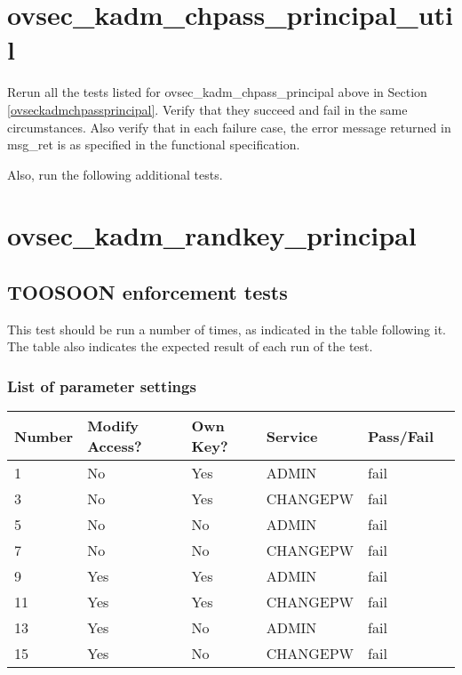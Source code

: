 \section{ovsec_kadm_chpass_principal_util}

Rerun all the tests listed for ovsec_kadm_chpass_principal above in
Section \ref{ovseckadmchpassprincipal}.  Verify that they succeed
and fail in the same circumstances.  Also verify that in each failure
case, the error message returned in msg_ret is as specified in the
functional specification.

Also, run the following additional tests.







\section{ovsec_kadm_randkey_principal}

\subsection{TOOSOON enforcement tests}

This test should be run a number of times, as indicated in the table
following it.  The table also indicates the expected result of each
run of the test.


\subsubsection{List of parameter settings}

\begin{tabular}{llllll}
Number & Modify Access? & Own Key? & Service & Pass/Fail \\ \hline
1 & No & Yes & ADMIN & fail \\
3 & No & Yes & CHANGEPW & fail \\
5 & No & No & ADMIN & fail \\
7 & No & No & CHANGEPW & fail \\
9 & Yes & Yes & ADMIN & fail \\
11 & Yes & Yes & CHANGEPW & fail \\
13 & Yes & No & ADMIN & fail \\
15 & Yes & No & CHANGEPW & fail \\
\end{tabular}

